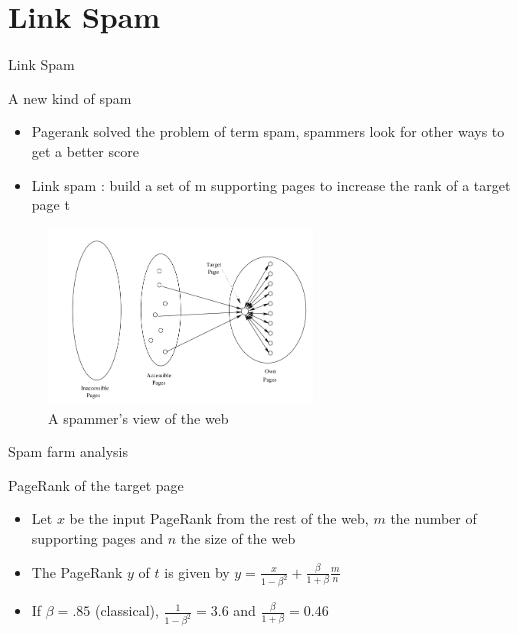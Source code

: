 \documentclass[10pt]{beamer}
\begin{document}
\section{Link Spam}
\begin{frame}{Link Spam}
\begin{block}{A new kind of spam}
\begin{itemize}
\item Pagerank solved the problem of term spam, spammers look for other ways to get a better score
\item Link spam : build a set of m supporting pages to increase the rank of a target page t
\end{itemize}
\end{block}
\begin{figure}
\centering
	\includegraphics[width=7cm]{SpamFarm.png}
\caption{A spammer's view of the web}
\end{figure}
\end{frame}

\begin{frame}{Spam farm analysis}
\begin{block}{PageRank of the target page}
\begin{itemize}
\item Let $x$ be the input PageRank from the rest of the web, $m$ the number of supporting pages and $n$ the size of the web
\item The PageRank $y$ of $t$ is given by
$ y = \frac{x}{1-\beta^2}+ \frac{\beta}{1+\beta} \frac{m}{n}$
\item If $\beta=.85$ (classical), $\frac{1}{1-\beta^2} = 3.6$ and $\frac{\beta}{1+\beta} = 0.46$
\end{itemize}
\end{block}
\end{frame}
\end{document}
